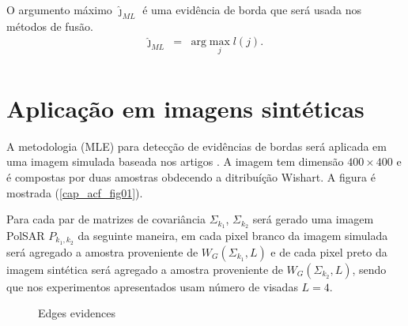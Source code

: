 \documentclass[conference]{IEEEtran}
\begin{document}
O argumento máximo  $\widehat{\jmath}_{ML}$ é uma evidência de borda que será usada nos métodos de fusão.
\begin{equation*}
\begin{array}{rcl}
	\widehat{\jmath}_{ML}&=&\text{arg}\max\limits_{j}l(j).  \\
\end{array}
\end{equation*}

\section{Aplicação em imagens sintéticas}\label{cap_acf_sec4}

A metodologia (MLE) para detecção de evidências de bordas será aplicada em uma imagem simulada baseada nos artigos \cite{nhfc,gamf}. A imagem tem dimensão $400\times400$  e é compostas por duas amostras obdecendo a ditribuíção Wishart. A figura é mostrada  (\ref{cap_acf_fig01}).

Para cada par de matrizes de covariância $\Sigma_{k_1}$, $\Sigma_{k_2}$ será gerado uma imagem PolSAR $P_{k_1,k_2}$ da seguinte maneira, em cada pixel branco da imagem simulada será agregado a amostra proveniente de $W_G(\Sigma_{k_1}, L)$ e de cada pixel preto da imagem sintética será agregado a amostra proveniente de $W_G(\Sigma_{k_2},L)$, sendo que nos experimentos apresentados usam número de visadas $L=4$.

\begin{figure}[hbt]
    \caption{Edges evidences}
     \label{fig_Edges-Evidence}
\end{figure}   
   
\end{document}
